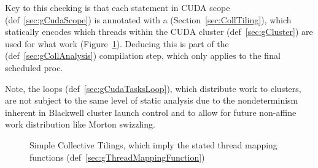 Key to this checking is that each statement in CUDA scope (def~\ref{sec:gCudaScope}) is annotated with a  (Section~\ref{sec:CollTiling}), which statically encodes which threads within the CUDA cluster (def~\ref{sec:gCluster}) are used for what work (Figure~\ref{fig:OverviewCollTiling}).
Deducing this is part of the  (def~\ref{sec:gCollAnalysis}) compilation step, which only applies to the final scheduled proc.

Note, the  loops (def~\ref{sec:gCudaTasksLoop}), which distribute work to clusters, are not subject to the same level of static analysis due to the nondeterminism inherent in Blackwell cluster launch control and to allow for future non-affine work distribution like Morton swizzling.

\begin{figure}[t!]
\codehrule

\caption{Simple Collective Tilings, which imply the stated thread mapping functions (def~\ref{sec:gThreadMappingFunction})}
\label{fig:OverviewCollTiling}
\codehrule
\end{figure}


